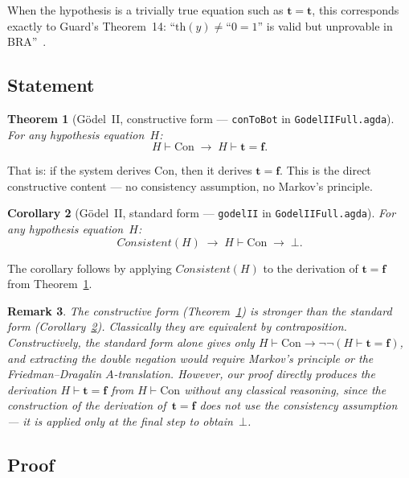\documentclass[11pt]{article}
\newtheorem{theorem}{Theorem}
\newtheorem{corollary}[theorem]{Corollary}
\newtheorem{remark}[theorem]{Remark}
\newcommand{\trueT}{\mathbf{t}}
\newcommand{\falseT}{\mathbf{f}}
\begin{document}
\noindent
When the hypothesis is a trivially true equation such as
$\trueT = \trueT$, this corresponds exactly to Guard's
Theorem~14: ``$\mathrm{th}(y) \neq \text{``}0 = 1\text{''}$
is valid but unprovable in BRA''~\cite{guard1963}.

\subsection*{Statement}

\begin{theorem}[G\"odel~II, constructive form --- \texttt{conToBot} in \texttt{GodelIIFull.agda}]
\label{thm:godel2c}
For any hypothesis equation~$H$:
\[
  H \vdash \mathrm{Con} \;\to\;
  H \vdash \trueT = \falseT.
\]
\end{theorem}

\noindent
That is: if the system derives $\mathrm{Con}$,
then it derives $\trueT = \falseT$.  This is the direct constructive
content --- no consistency assumption, no Markov's principle.

\begin{corollary}[G\"odel~II, standard form --- \texttt{godelII} in \texttt{GodelIIFull.agda}]
\label{thm:godel2}
For any hypothesis equation~$H$:
\[
  \mathit{Consistent}(H) \;\to\;
  H \vdash \mathrm{Con} \;\to\; \bot.
\]
\end{corollary}

\noindent
The corollary follows by applying $\mathit{Consistent}(H)$
to the derivation of $\trueT = \falseT$ from
Theorem~\ref{thm:godel2c}.

\begin{remark}
The constructive form (Theorem~\ref{thm:godel2c}) is stronger
than the standard form (Corollary~\ref{thm:godel2}).
Classically they are equivalent by contraposition.
Constructively, the standard form alone gives only
$H \vdash \mathrm{Con} \to \lnot\lnot(H \vdash
\trueT = \falseT)$, and extracting the double negation
would require Markov's principle or
the Friedman--Dragalin $A$-translation.
However, our proof directly produces the derivation
$H \vdash \trueT = \falseT$ from $H \vdash \mathrm{Con}$
without any classical reasoning, since the construction of
the derivation of~$\trueT = \falseT$ does not use the consistency
assumption --- it is applied only at the final step to obtain~$\bot$.
\end{remark}

\subsection*{Proof}
\end{document}
